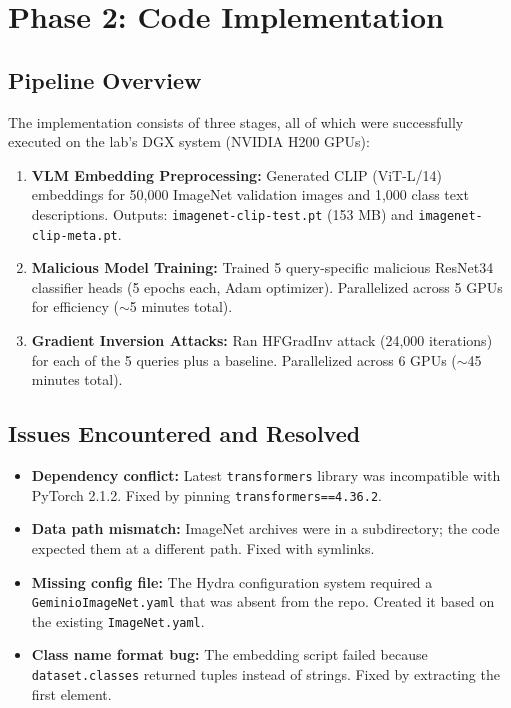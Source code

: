 \documentclass[11pt]{article}
\begin{document}
\section{Phase 2: Code Implementation}

\subsection{Pipeline Overview}

The implementation consists of three stages, all of which were successfully executed on the lab's DGX system (NVIDIA H200 GPUs):

\begin{enumerate}[nosep]
    \item \textbf{VLM Embedding Preprocessing:} Generated CLIP (ViT-L/14) embeddings for 50,000 ImageNet validation images and 1,000 class text descriptions. Outputs: \texttt{imagenet-clip-test.pt} (153 MB) and \texttt{imagenet-clip-meta.pt}.

    \item \textbf{Malicious Model Training:} Trained 5 query-specific malicious ResNet34 classifier heads (5 epochs each, Adam optimizer). Parallelized across 5 GPUs for efficiency ($\sim$5 minutes total).

    \item \textbf{Gradient Inversion Attacks:} Ran HFGradInv attack (24,000 iterations) for each of the 5 queries plus a baseline. Parallelized across 6 GPUs ($\sim$45 minutes total).
\end{enumerate}

\subsection{Issues Encountered and Resolved}

\begin{itemize}[nosep]
    \item \textbf{Dependency conflict:} Latest \texttt{transformers} library was incompatible with PyTorch 2.1.2. Fixed by pinning \texttt{transformers==4.36.2}.
    \item \textbf{Data path mismatch:} ImageNet archives were in a subdirectory; the code expected them at a different path. Fixed with symlinks.
    \item \textbf{Missing config file:} The Hydra configuration system required a \texttt{GeminioImageNet.yaml} that was absent from the repo. Created it based on the existing \texttt{ImageNet.yaml}.
    \item \textbf{Class name format bug:} The embedding script failed because \texttt{dataset.classes} returned tuples instead of strings. Fixed by extracting the first element.
\end{itemize}
\end{document}
